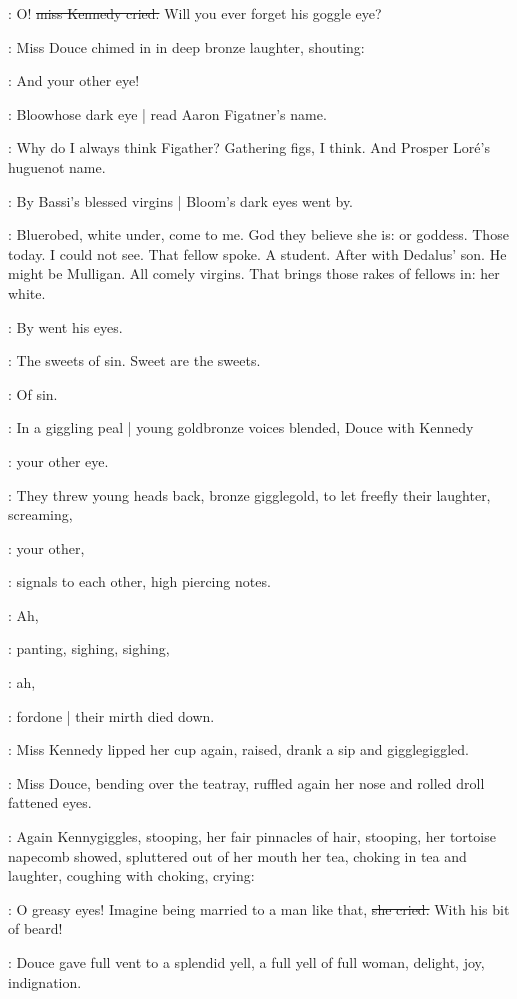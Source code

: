 \MissK:
O!
\stage{[shrieking]}
\sout{miss Kennedy cried.}
Will you ever forget his goggle eye?

:
Miss Douce chimed in in deep bronze laughter,
shouting:

\MissD:
And your other eye!

:
Bloowhose dark eye |
read Aaron Figatner's name.

\BloomInt:
Why do I always think Figather?
Gathering figs,
I think.
And Prosper Loré's huguenot name.

:
By Bassi's blessed virgins |
Bloom's dark eyes went by.

\BloomInt:
Bluerobed,
white under,
come to me.
God they believe she is:
or goddess.
Those today.
I could not see.
That fellow spoke.
A student.
After with Dedalus' son.
He might be Mulligan.
All comely virgins.
That brings those rakes of fellows in:
her white.

:
By went his eyes.

\BloomInt:
The sweets of sin.
Sweet are the sweets.

:
Of sin.

:
In a giggling peal |
young goldbronze voices blended,
Douce with Kennedy

\MissesDK:
your other eye.

:
They threw young heads back,
bronze gigglegold,
to let freefly their laughter,
screaming,

\MissesDK:
your other,

:
signals to each other,
high piercing notes.

\MissesDK:
Ah,

:
panting,
sighing,
sighing,

\MissesDK:
ah,

:
fordone |
their mirth died down.

:
Miss Kennedy lipped her cup again,
raised,
drank a sip and gigglegiggled.

:
Miss Douce,
bending over the teatray,
ruffled again her nose
and rolled droll fattened eyes.

:
Again Kennygiggles,
stooping,
her fair pinnacles of hair,
stooping,
her tortoise napecomb showed,
spluttered out of her mouth her tea,
choking in tea and laughter,
coughing with choking,
crying:

\MissK:
O greasy eyes!
Imagine being married to a man like that,
\sout{she cried.}
With his bit
of beard!

:
Douce gave full vent to a splendid yell,
a full yell of full woman,
delight,
joy,
indignation.

